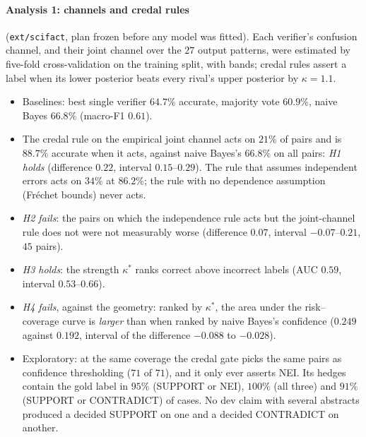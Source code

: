 \documentclass[11pt]{article}
\theoremstyle{definition}
\theoremstyle{remark}
\begin{document}
\paragraph{Analysis 1: channels and credal rules} (\texttt{ext/scifact}, plan frozen before any model was fitted). Each verifier's
confusion channel, and their joint channel over the $27$ output patterns, were estimated by five-fold cross-validation on the
training split, with bands; credal rules assert a label when its lower posterior beats every rival's upper posterior by
$\kappa=1.1$.
\begin{itemize}[leftmargin=*,nosep]
\item Baselines: best single verifier $64.7\%$ accurate, majority vote $60.9\%$, naive Bayes $66.8\%$ (macro-F1 $0.61$).
\item The credal rule on the empirical joint channel acts on $21\%$ of pairs and is $88.7\%$ accurate when it acts, against naive
  Bayes's $66.8\%$ on all pairs: \emph{H1 holds} (difference $0.22$, interval $0.15$--$0.29$). The rule that assumes independent
  errors acts on $34\%$ at $86.2\%$; the rule with no dependence assumption (Fréchet bounds) never acts.
\item \emph{H2 fails}: the pairs on which the independence rule acts but the joint-channel rule does not were not measurably worse
  (difference $0.07$, interval $-0.07$--$0.21$, $45$ pairs).
\item \emph{H3 holds}: the strength $\kappa^*$ ranks correct above incorrect labels (AUC $0.59$, interval $0.53$--$0.66$).
\item \emph{H4 fails}, against the geometry: ranked by $\kappa^*$, the area under the risk--coverage curve is \emph{larger} than when
  ranked by naive Bayes's confidence ($0.249$ against $0.192$, interval of the difference $-0.088$ to $-0.028$).
\item Exploratory: at the same coverage the credal gate picks the same pairs as confidence thresholding ($71$ of $71$), and it only
  ever asserts NEI. Its hedges contain the gold label in $95\%$ (SUPPORT or NEI), $100\%$ (all three) and $91\%$ (SUPPORT or
  CONTRADICT) of cases. No dev claim with several abstracts produced a decided SUPPORT on one and a decided CONTRADICT on another.
\end{itemize}
\end{document}
